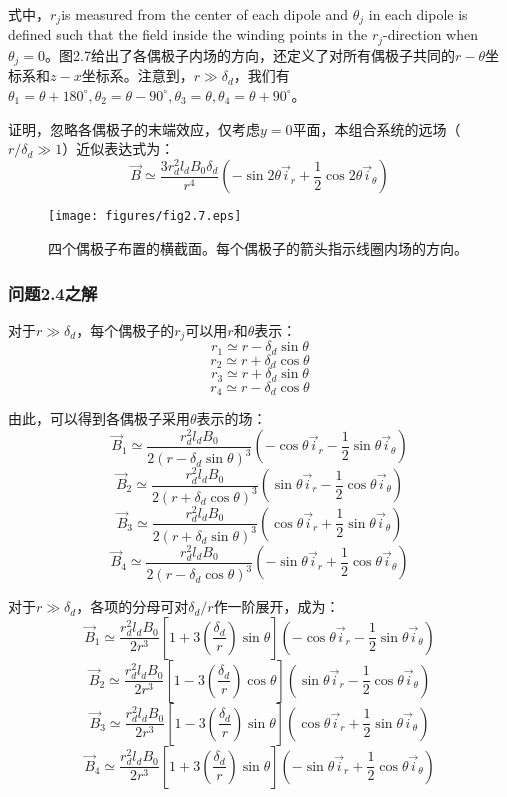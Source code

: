 式中，$r_j$is measured from the center of each dipole and $\theta_j$ in each dipole is defined such that the field inside the winding points in the $r_j$-direction when $\theta_j=0$。图2.7给出了各偶极子内场的方向，还定义了对所有偶极子共同的$r-\theta$坐标系和$z-x$坐标系。注意到，$r\gg \delta_d$，我们有$\mathscr{\theta}_1=\theta+180^\circ,\theta_2=\theta-90^\circ,\theta_3=\theta,\theta_4=\theta + 90^\circ$。

证明，忽略各偶极子的末端效应，仅考虑$y=0$平面，本组合系统的远场（$r/\delta_d \gg 1$）近似表达式为：
$$ \vec{B}\simeq \frac{3r_d^2 l_d B_0 \delta_d}{r^4}(-\sin 2\theta \vec{i}_r+\frac{1}{2}\cos 2\theta \vec{i}_\theta)$$

\begin{figure}
  \centering
 \texttt{[image: figures/fig2.7.eps]}
  \caption{四个偶极子布置的横截面。每个偶极子的箭头指示线圈内场的方向。}
\end{figure}


\subsubsection*{问题2.4之解}
对于$r\gg \delta_d$，每个偶极子的$r_j$可以用$r$和$\theta$表示：
$$r_1\simeq r-\delta_d \sin\theta$$
$$r_2\simeq r+\delta_d \cos\theta$$
$$r_3\simeq r+\delta_d \sin\theta$$
$$r_4\simeq r-\delta_d \cos\theta$$

由此，可以得到各偶极子采用$\theta$表示的场：
$$ \vec{B}_1 \simeq \frac{r_d^2 l_d B_0}{2(r-\delta_d\sin\theta)^3}(-\cos\theta \vec{i}_r-\frac{1}{2}\sin\theta \vec{i}_\theta)$$
$$ \vec{B}_2 \simeq \frac{r_d^2 l_d B_0}{2(r+\delta_d\cos\theta)^3}(\sin\theta \vec{i}_r-\frac{1}{2}\cos\theta \vec{i}_\theta)$$
$$ \vec{B}_3 \simeq \frac{r_d^2 l_d B_0}{2(r+\delta_d\sin\theta)^3}(\cos\theta \vec{i}_r+\frac{1}{2}\sin\theta \vec{i}_\theta)$$
$$ \vec{B}_4 \simeq \frac{r_d^2 l_d B_0}{2(r-\delta_d\cos\theta)^3}(-\sin\theta \vec{i}_r+\frac{1}{2}\cos\theta \vec{i}_\theta)$$

对于$r\gg \delta_d$，各项的分母可对$\delta_d/r$作一阶展开，成为：
$$ \vec{B}_1 \simeq \frac{r_d^2 l_d B_0}{2 r^3}\left[1+3(\frac{\delta_d}{r})\sin\theta \right](-\cos\theta \vec{i}_r-\frac{1}{2}\sin\theta \vec{i}_\theta)$$
$$ \vec{B}_2 \simeq \frac{r_d^2 l_d B_0}{2 r^3}\left[1-3(\frac{\delta_d}{r})\cos\theta \right](\sin\theta \vec{i}_r-\frac{1}{2}\cos\theta \vec{i}_\theta)$$
$$ \vec{B}_3 \simeq \frac{r_d^2 l_d B_0}{2 r^3}\left[1-3(\frac{\delta_d}{r})\sin\theta \right](\cos\theta \vec{i}_r+\frac{1}{2}\sin\theta \vec{i}_\theta)$$
$$ \vec{B}_4 \simeq \frac{r_d^2 l_d B_0}{2 r^3}\left[1+3(\frac{\delta_d}{r})\sin\theta \right](-\sin\theta \vec{i}_r+\frac{1}{2}\cos\theta \vec{i}_\theta)$$

